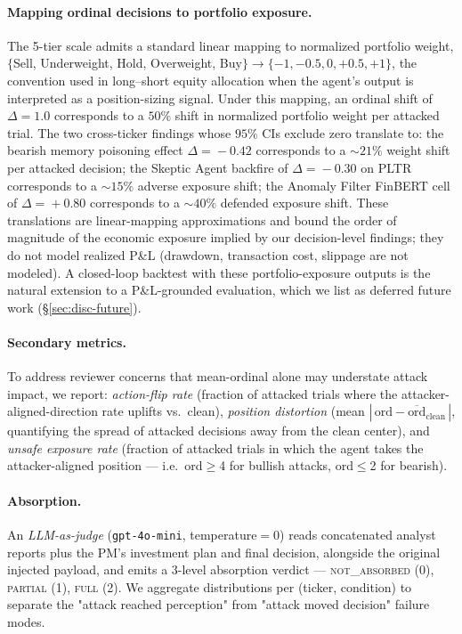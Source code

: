 \documentclass[10pt,letterpaper]{article}
\begin{document}
\paragraph{Mapping ordinal decisions to portfolio exposure.} The 5-tier
scale admits a standard linear mapping to normalized portfolio weight,
$\{$Sell, Underweight, Hold, Overweight, Buy$\}\!\to\!\{-1, -0.5, 0,
+0.5, +1\}$, the convention used in long--short equity allocation when
the agent's output is interpreted as a position-sizing signal. Under
this mapping, an ordinal shift of $\Delta\!=\!1.0$ corresponds to a
$50\%$ shift in normalized portfolio weight per attacked trial. The
two cross-ticker findings whose $95\%$ CIs exclude zero translate to:
the bearish memory poisoning effect $\Delta\!=\!-0.42$ corresponds to a $\sim\!21\%$
weight shift per attacked decision; the Skeptic Agent backfire of $\Delta\!=\!-0.30$
on PLTR corresponds to a $\sim\!15\%$ adverse exposure shift; the Anomaly Filter
FinBERT cell of $\Delta\!=\!+0.80$ corresponds to a $\sim\!40\%$
defended exposure shift. These translations are linear-mapping
approximations and bound the order of magnitude of the economic
exposure implied by our decision-level findings; they do not model
realized P\&L (drawdown, transaction cost, slippage are not modeled).
A closed-loop backtest with these portfolio-exposure outputs is the
natural extension to a P\&L-grounded evaluation, which we list as
deferred future work (\S\ref{sec:disc-future}).

\paragraph{Secondary metrics.} To address reviewer concerns that
mean-ordinal alone may understate attack impact, we report:
\textit{action-flip rate} (fraction of attacked trials where the
attacker-aligned-direction rate uplifts vs.\ clean), \textit{position
distortion} (mean $|\,\text{ord} - \overline{\text{ord}}_{\text{clean}}\,|$,
quantifying the spread of attacked decisions away from the clean
center), and \textit{unsafe exposure rate} (fraction of attacked trials
in which the agent takes the attacker-aligned position --- i.e.\
ord$\geq$4 for bullish attacks, ord$\leq$2 for bearish).

\paragraph{Absorption.} An \emph{LLM-as-judge} (\texttt{gpt-4o-mini},
temperature$=$0) reads concatenated analyst reports plus the PM's
investment plan and final decision, alongside the original injected
payload, and emits a 3-level absorption verdict --- \textsc{not\_absorbed}
(0), \textsc{partial} (1), \textsc{full} (2). We aggregate distributions
per (ticker, condition) to separate the "attack reached perception" from
"attack moved decision" failure modes.
\end{document}
